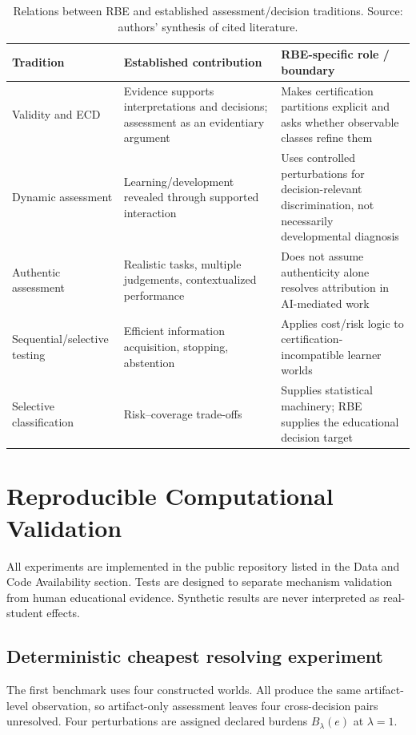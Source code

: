 \documentclass[11pt]{article}
\begin{document}
\begin{table}[t]
\centering
\caption{Relations between RBE and established assessment/decision traditions. Source: authors' synthesis of cited literature.}
\label{tab:boundary}
\small
\begin{tabularx}{\textwidth}{p{}p{}X}
\toprule
Tradition & Established contribution & RBE-specific role / boundary \\
\midrule
Validity and ECD & Evidence supports interpretations and decisions; assessment as an evidentiary argument & Makes certification partitions explicit and asks whether observable classes refine them \\
Dynamic assessment & Learning/development revealed through supported interaction & Uses controlled perturbations for decision-relevant discrimination, not necessarily developmental diagnosis \\
Authentic assessment & Realistic tasks, multiple judgements, contextualized performance & Does not assume authenticity alone resolves attribution in AI-mediated work \\
Sequential/selective testing & Efficient information acquisition, stopping, abstention & Applies cost/risk logic to certification-incompatible learner worlds \\
Selective classification & Risk--coverage trade-offs & Supplies statistical machinery; RBE supplies the educational decision target \\
\bottomrule
\end{tabularx}
\end{table}

\section{Reproducible Computational Validation}
All experiments are implemented in the public repository listed in the Data and Code Availability section. Tests are designed to separate mechanism validation from human educational evidence. Synthetic results are never interpreted as real-student effects.

\subsection{Deterministic cheapest resolving experiment}
The first benchmark uses four constructed worlds. All produce the same artifact-level observation, so artifact-only assessment leaves four cross-decision pairs unresolved. Four perturbations are assigned declared burdens $B_\lambda(e)$ at $\lambda=1$.
\end{document}
